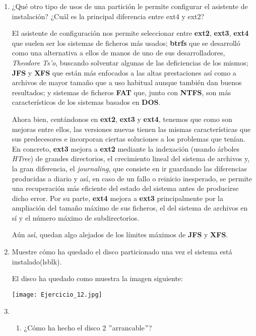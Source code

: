 \documentclass[paper=a4, fontsize=11pt]{scrartcl} %
\numberwithin{equation}{section} %
\numberwithin{figure}{section} %
\numberwithin{table}{section} %
\begin{document}
\begin{enumerate}
		\item ¿Qué otro tipo de usos de una partición le permite configurar el asistente de instalación?
		¿Cuál es la principal diferencia entre ext4 y ext2?
		
		El asistente de configuración nos permite seleccionar entre \textbf{ext2}\cite{ext2},
		\textbf{ext3}\cite{ext3}, \textbf{ext4}\cite{ext4} que suelen ser los sistemas de ficheros más
		usados; \textbf{btrfs}\cite{btrfs} que se desarrolló como una alternativa a ellos de manos de
		uno de sus desarrolladores, \textit{Theodore Ts'o}, buscando solventar algunas de las
		deficiencias de los mismos; \textbf{JFS}\cite{JFS} y \textbf{XFS}\cite{XFS} que están más
		enfocados a las altas prestaciones así como a archivos de mayor tamaño que a uso habitual
		aunque también dan buenos resultados; y sistemas de ficheros \textbf{FAT}\cite{FAT} que,
		junto con \textbf{NTFS}\cite{NTFS}, son más característicos de los sistemas basados en
		\textbf{DOS}.
		
		Ahora bien, centándonos en \textbf{ext2}, \textbf{ext3} y \textbf{ext4}, tenemos que como son
		mejoras entre ellos, las versiones nuevas tienen las mismas características que sus predecesores
		e incorporan ciertas soluciones a los problemas que tenían.
		\newline
		En concreto, \textbf{ext3} mejora a \textbf{ext2} mediante la indexación (usando árboles
		\textit{HTree}) de grandes directorios, el crecimiento lineal del sistema de archivos y, la
		gran diferencia, el \textit{journaling}\cite{journaling}, que consiste en ir guardando las
		diferencias producidas a diario y así, en caso de un fallo o reinicio inesperado, se permite
		una recuperación más eficiente del estado del sistema antes de producirse dicho error.
		\newline
		Por su parte, \textbf{ext4} mejora a \textbf{ext3} principalmente por la ampliación del tamaño
		máximo de sus ficheros, el del sistema de archivos en sí y el número máximo de subdirectorios.
		
		Aún así, quedan algo alejados de los límites máximos de \textbf{JFS} y \textbf{XFS}.
		
		\item Muestre cómo ha quedado el disco particionado una vez el sistema está instalado(lsblk).
		
		El disco ha quedado como muestra la imagen siguiente:
		
		\texttt{[image: Ejercicio\_12.jpg]}
		
		\item \begin{enumerate}
			\item ¿Cómo ha hecho el disco 2 $"$arrancable$"$?
			

\end{enumerate}
\end{enumerate}
\end{document}
